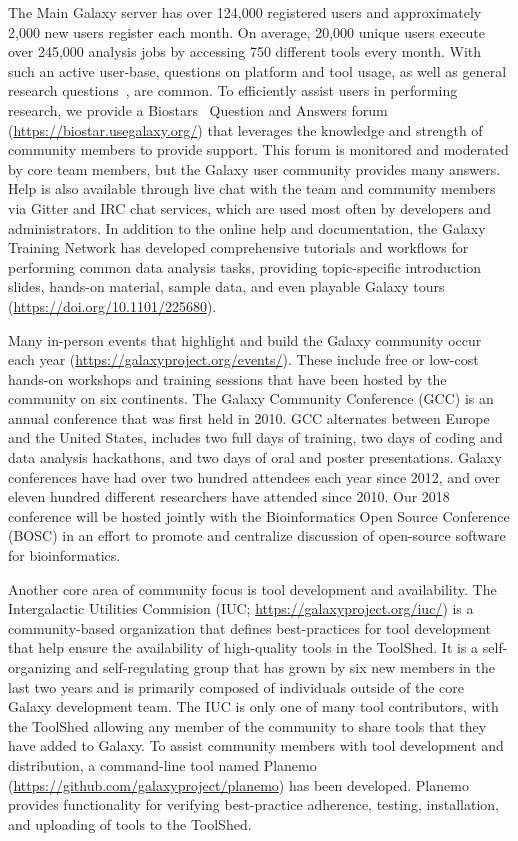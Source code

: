 The Main Galaxy server has over 124,000 registered users and approximately 2,000 new users register each month. On average, 20,000 unique users execute over 245,000 analysis jobs by accessing 750 different tools every month. With such an active user-base, questions on platform and tool usage, as well as general research questions~\cite{blankenberg2015online}, are common. To efficiently assist users in performing research, we provide a Biostars~\cite{parnell2011biostar} Question and Answers forum (\url{https://biostar.usegalaxy.org/}) that leverages the knowledge and strength of community members to provide support. This forum is monitored and moderated by core team members, but the Galaxy user community provides many answers. Help is also available through live chat with the team and community members via Gitter and IRC chat services, which are used most often by developers and administrators. In addition to the online help and documentation, the Galaxy Training Network has developed comprehensive tutorials and workflows for performing common data analysis tasks, providing topic-specific introduction slides, hands-on material, sample data, and even playable Galaxy tours (\url{https://doi.org/10.1101/225680}).

Many in-person events that highlight and build the Galaxy community occur each year (\url{https://galaxyproject.org/events/}). These include free or low-cost hands-on workshops and training sessions that have been hosted by the community on six continents. The Galaxy Community Conference (GCC) is an annual conference that was first held in 2010. GCC alternates between Europe and the United States, includes two full days of training, two days of coding and data analysis hackathons, and two days of oral and poster presentations. Galaxy conferences have had over two hundred attendees each year since 2012, and over eleven hundred different researchers have attended since 2010. Our 2018 conference will be hosted jointly with the Bioinformatics Open Source Conference (BOSC) in an effort to promote and centralize discussion of open-source software for bioinformatics.

Another core area of community focus is tool development and availability. The Intergalactic Utilities Commision (IUC; \url{https://galaxyproject.org/iuc/}) is a community-based organization that defines best-practices for tool development that help ensure the availability of high-quality tools in the ToolShed. It is a self-organizing and self-regulating group that has grown by six new members in the last two years and is primarily composed of individuals outside of the core Galaxy development team. The IUC is only one of many tool contributors, with the ToolShed allowing any member of the community to share tools that they have added to Galaxy. To assist community members with tool development and distribution, a command-line tool named Planemo (\url{https://github.com/galaxyproject/planemo}) has been developed. Planemo provides functionality for verifying best-practice adherence, testing, installation, and uploading of tools to the ToolShed.

